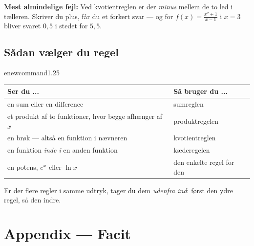 \documentclass[11pt,a4paper]{article}
\begin{document}
\vspace{4pt}
\noindent
\textbf{Mest almindelige fejl:} Ved kvotientreglen er der \emph{minus}
mellem de to led i tælleren. Skriver du plus, får du et forkert svar --- og
for $f(x) = \frac{x^{2}+1}{x-1}$ i $x = 3$ bliver svaret $0{,}5$ i stedet
for $5{,}5$.

\subsection*{Sådan vælger du regel}

\begin{center}

enewcommand{\arraystretch}{1.25}
\begin{tabular}{@{}p{8.4cm}p{7.1cm}@{}}
\toprule
\textbf{Ser du ...} & \textbf{Så bruger du ...} \\
\midrule
en sum eller en difference & sumreglen \\
et produkt af to funktioner, hvor begge afhænger af $x$ & produktregelen \\
en brøk --- altså en funktion i nævneren & kvotientreglen \\
en funktion \emph{inde i} en anden funktion & kæderegelen \\
en potens, $e^{x}$ eller $\ln x$ & den enkelte regel for den \\
\bottomrule
\end{tabular}
\end{center}

\noindent
Er der flere regler i samme udtryk, tager du dem \emph{udenfra ind}: først
den ydre regel, så den indre.

\newpage
\section*{Appendix --- Facit}
\end{document}
